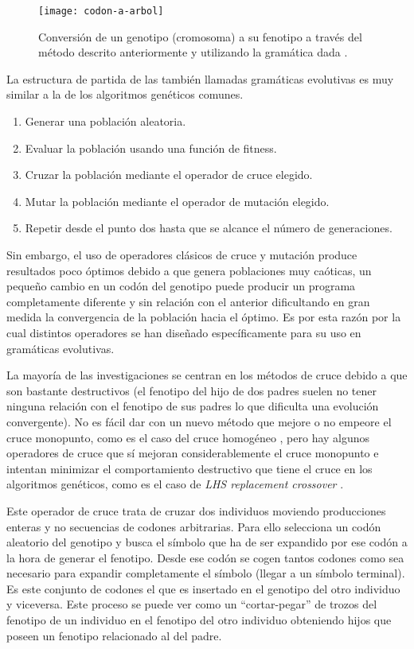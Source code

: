 \begin{figure}[H]
\centering
\texttt{[image: codon-a-arbol]}
\caption{Conversión de un genotipo (cromosoma) a su fenotipo a través del método descrito anteriormente y utilizando la gramática dada \cite{colmenarApuntes}.}
\end{figure}

La estructura de partida de las también llamadas gramáticas evolutivas es muy similar a la de los algoritmos genéticos comunes.
\begin{enumerate}
\item Generar una población aleatoria.
\item Evaluar la población usando una función de fitness.
\item Cruzar la población mediante el operador de cruce elegido.
\item Mutar la población mediante el operador de mutación elegido.
\item Repetir desde el punto dos hasta que se alcance el número de generaciones.
\end{enumerate}

Sin embargo, el uso de operadores clásicos de cruce y mutación produce resultados poco óptimos debido a que genera poblaciones muy caóticas, un pequeño cambio en un codón del genotipo puede producir un programa completamente diferente y sin relación con el anterior dificultando en gran medida la convergencia de la población hacia el óptimo. Es por esta razón por la cual distintos operadores se han diseñado específicamente para su uso en gramáticas evolutivas.

La mayoría de las investigaciones se centran en los métodos de cruce debido a que son bastante destructivos (el fenotipo del hijo de dos padres suelen no tener ninguna relación con el fenotipo de sus padres lo que dificulta una evolución convergente). No es fácil dar con un nuevo método que mejore o no empeore el cruce monopunto, como es el caso del cruce homogéneo \cite{O'neill:2003:CGE:608284.608289}, pero hay algunos operadores de cruce que sí mejoran considerablemente el cruce monopunto e intentan minimizar el comportamiento destructivo que tiene el cruce en los algoritmos genéticos, como es el caso de \textit{LHS replacement crossover} \cite{harper2005structure}.

Este operador de cruce trata de cruzar dos individuos moviendo producciones enteras y no secuencias de codones arbitrarias. Para ello selecciona un codón aleatorio del genotipo y busca el símbolo que ha de ser expandido por ese codón a la hora de generar el fenotipo. Desde ese codón se cogen tantos codones como sea necesario para expandir completamente el símbolo (llegar a un símbolo terminal). Es este conjunto de codones el que es insertado en el genotipo del otro individuo y viceversa. Este proceso se puede ver como un ``cortar-pegar'' de trozos del fenotipo de un individuo en el fenotipo del otro individuo obteniendo hijos que poseen un fenotipo relacionado al del padre.

